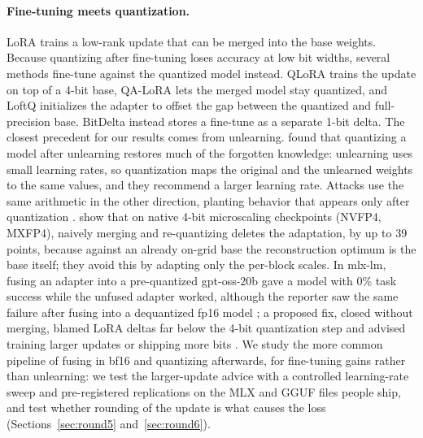 \documentclass[10pt]{article}
\begin{document}
\paragraph{Fine-tuning meets quantization.} LoRA \citep{hu2022lora} trains a low-rank update that can be merged into the base weights. Because quantizing after fine-tuning loses accuracy at low bit widths, several methods fine-tune against the quantized model instead. QLoRA \citep{dettmers2023qlora} trains the update on top of a 4-bit base, QA-LoRA \citep{xu2023qalora} lets the merged model stay quantized, and LoftQ \citep{li2023loftq} initializes the adapter to offset the gap between the quantized and full-precision base. BitDelta \citep{liu2024bitdelta} instead stores a fine-tune as a separate 1-bit delta. The closest precedent for our results comes from unlearning. \citet{zhang2025unlearning} found that quantizing a model after unlearning restores much of the forgotten knowledge: unlearning uses small learning rates, so quantization maps the original and the unlearned weights to the same values, and they recommend a larger learning rate. Attacks use the same arithmetic in the other direction, planting behavior that appears only after quantization \citep{egashira2024exploiting,egashira2025gguf}. \citet{li2026scaleqlora} show that on native 4-bit microscaling checkpoints (NVFP4, MXFP4), naively merging and re-quantizing deletes the adaptation, by up to 39 points, because against an already on-grid base the reconstruction optimum is the base itself; they avoid this by adapting only the per-block scales. In mlx-lm, fusing an adapter into a pre-quantized gpt-oss-20b gave a model with 0\% task success while the unfused adapter worked, although the reporter saw the same failure after fusing into a dequantized fp16 model \citep{mlxlm1172}; a proposed fix, closed without merging, blamed LoRA deltas far below the 4-bit quantization step and advised training larger updates or shipping more bits \citep{mlxlm1564}. We study the more common pipeline of fusing in bf16 and quantizing afterwards, for fine-tuning gains rather than unlearning: we test the larger-update advice with a controlled learning-rate sweep and pre-registered replications on the MLX and GGUF files people ship, and test whether rounding of the update is what causes the loss (Sections~\ref{sec:round5} and~\ref{sec:round6}).
\end{document}
